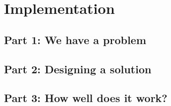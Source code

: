 \section{Implementation}\label{s:implementation}

%     

\subsection{Part 1: We have a problem}



\subsection{Part 2: Designing a solution}


\subsection{Part 3: How well does it work?}